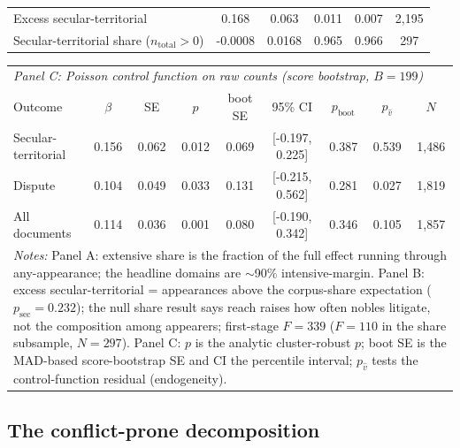 \documentclass[12pt]{article}
\theoremstyle{definition}
\theoremstyle{remark}
\begin{document}
\begin{table}[t]
{\begin{tabular}{lccccc}
Excess secular-territorial & 0.168 & 0.063 & 0.011 & 0.007 & 2,195 \\
Secular-territorial share ($n_{\text{total}}>0$) & -0.0008 & 0.0168 & 0.965 & 0.966 & 297 \\
\bottomrule
\end{tabular}
\par\vspace{1.5ex}
\begin{tabular}{lcccccccc}
\toprule
\multicolumn{9}{l}{\textit{Panel C: Poisson control function on raw counts (score bootstrap, $B=199$)}} \\
\addlinespace
Outcome & $\beta$ & SE & $p$ & boot SE & 95\% CI & $p_{\text{boot}}$ & $p_{\hat v}$ & $N$ \\
\midrule
Secular-territorial & 0.156 & 0.062 & 0.012 & 0.069 & [-0.197, 0.225] & 0.387 & 0.539 & 1,486 \\
Dispute & 0.104 & 0.049 & 0.033 & 0.131 & [-0.215, 0.562] & 0.281 & 0.027 & 1,819 \\
All documents & 0.114 & 0.036 & 0.001 & 0.080 & [-0.190, 0.342] & 0.346 & 0.105 & 1,857 \\
\midrule
\multicolumn{9}{p{0.9\textwidth}}{\footnotesize \textit{Notes:} Panel A: extensive share is the fraction of the full effect running through any-appearance; the headline domains are $\sim$90\% intensive-margin. Panel B: excess secular-territorial = appearances above the corpus-share expectation ($p_{\text{sec}}=0.232$); the null share result says reach raises how often nobles litigate, not the composition among appearers; first-stage $F=339$ ($F=110$ in the share subsample, $N=297$). Panel C: $p$ is the analytic cluster-robust $p$; boot SE is the MAD-based score-bootstrap SE and CI the percentile interval; $p_{\hat v}$ tests the control-function residual (endogeneity).} \\
\bottomrule
\end{tabular}
}
\end{table}



\subsection{The conflict-prone decomposition}
\label{app:cp2}
\end{document}
